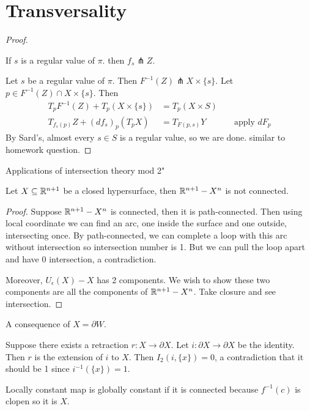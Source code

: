 \documentclass[12pt,class=article,crop=false]{standalone}
\begin{document}
\section{Transversality}
\begin{thm}

\end{thm}
\begin{proof}
\begin{claim}
If $ s$ is a regular value of  $ \pi$. then  $ f_s \pitchfork Z$.
\end{claim}
Let $ s$ be a regular value of  $ \pi$. Then $ F^{-1}(Z) \pitchfork X \times \{s\} $. Let $ p \in F^{-1}(Z) \cap X \times \{s\} $. Then
\begin{align*}
	T_pF^{-1}(Z) + T_p (X \times \{s\} ) &= T_p(X \times S)\\
	T_{f_s(p)} Z + (df_s)_p(T_p X) &= T_{F(p,s)} Y && \text{ apply } dF_p 
\end{align*}
By Sard's, almost every $ s \in S$ is a regular value, so we are done.
similar to homework question.
\end{proof}

Applications of intersection theory mod 2"
\begin{eg}
Let $ X \subseteq \mathbb{R}^{n+1}$ be a closed hypersurface, then $ \mathbb{R}^{n+1} - X^{n}$ is not connected.
\end{eg}
\begin{proof}
Suppose $ \mathbb{R}^{n+1} - X^{n}$ is connected, then it is path-connected. Then using local coordinate we can find an arc, one inside the surface and one outside, intersecting once. By path-connected, we can complete a loop with this arc without intersection so intersection number is 1. But we can pull the loop apart and have 0 intersection, a contradiction. 

Moreover, $ U_{ \epsilon}(X) - X$ has 2 components. We wish to show these two components are all the components of $ \mathbb{R}^{n+1} - X^{n}$. Take closure and see intersection.
\end{proof}

A consequence of $ X= \partial W$.
\begin{coro}[No-Retract]
Suppose there exists a retraction $ r: X \to \partial X$. Let $ i: \partial X \to \partial X$ be the identity. Then $ r$ is the extension of  $ i$ to  $ X$. Then  $ I_2(i, \{x\} ) = 0$, a contradiction that it should be 1 since $ i ^{-1}(\{x\}) =1 $.
\end{coro}

\begin{remark}
Locally constant map is globally constant if it is connected because $ f^{-1}(c)$ is clopen so it is $ X$.
\end{remark}
\end{document}
